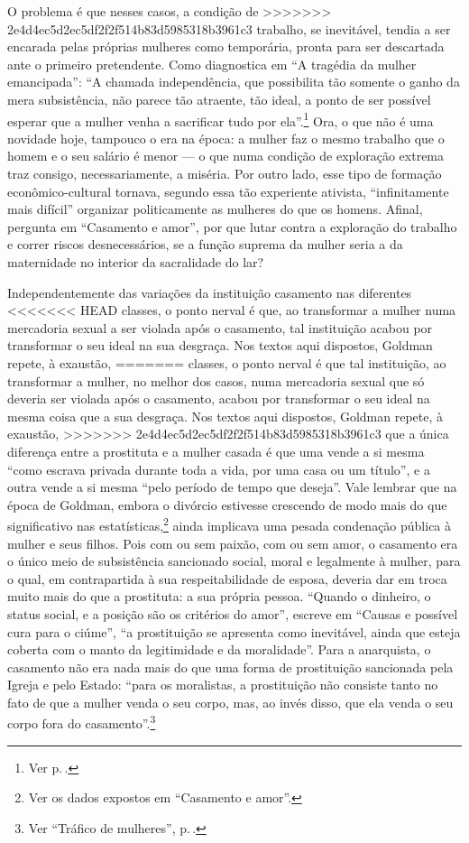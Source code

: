 O problema é que nesses casos, a condição de
>>>>>>> 2e4d4ec5d2ec5df2f2f514b83d5985318b3961c3
trabalho, se inevitável, tendia a ser encarada pelas próprias mulheres
como temporária, pronta para ser descartada ante o primeiro pretendente.
Como diagnostica em ``A tragédia da mulher emancipada'': ``A
chamada independência, que possibilita tão somente o ganho da mera
subsistência, não parece tão atraente, tão ideal, a ponto de ser possível
esperar que a mulher venha a sacrificar tudo por ela''.\footnote{Ver p.\,\pageref{ganho}.} Ora, o que não é
uma novidade hoje, tampouco o era na época: a mulher faz o mesmo
trabalho que o homem e o seu salário é menor --- o que numa condição de
exploração extrema traz consigo, necessariamente, a miséria. Por outro
lado, esse tipo de formação econômico-cultural tornava, segundo essa tão
experiente ativista, ``infinitamente mais difícil'' organizar
politicamente as mulheres do que os homens. Afinal, pergunta em
``Casamento e amor'', por que lutar contra a exploração do trabalho e
correr riscos desnecessários, se a função suprema da mulher seria a da
maternidade no interior da sacralidade do lar?

Independentemente das variações da instituição casamento nas diferentes
<<<<<<< HEAD
classes, o ponto nerval é que, ao transformar a mulher
numa mercadoria sexual a ser violada
após o casamento, tal instituição acabou por transformar o seu ideal na sua desgraça.
Nos textos aqui dispostos, Goldman repete, à exaustão,
=======
classes, o ponto nerval é que tal instituição, ao transformar a mulher,
no melhor dos casos, numa mercadoria sexual que só deveria ser violada
após o casamento, acabou por transformar o seu ideal na mesma coisa que
a sua desgraça. Nos textos aqui dispostos, Goldman repete, à exaustão,
>>>>>>> 2e4d4ec5d2ec5df2f2f514b83d5985318b3961c3
que a única diferença entre a prostituta e a mulher casada é que uma
vende a si mesma ``como escrava privada durante toda a vida, por uma
casa ou um título'', e a outra vende a si mesma ``pelo período de tempo
que deseja''. Vale lembrar que na época de Goldman, embora o divórcio
estivesse crescendo de modo mais do que significativo nas estatísticas,\footnote{Ver os dados expostos em ``Casamento e amor''.}
ainda implicava uma
pesada condenação pública à mulher e seus filhos. Pois com ou sem
paixão, com ou sem amor, o casamento era o único meio de subsistência
sancionado social, moral e legalmente à mulher, para o qual, em
contrapartida à sua respeitabilidade de esposa, deveria dar em troca
muito mais do que a prostituta: a sua própria pessoa. ``Quando o
dinheiro, o status social, e a posição são os critérios do amor'',
escreve em ``Causas e possível cura para o ciúme'', ``a prostituição se
apresenta como inevitável, ainda que esteja coberta com o manto da
legitimidade e da moralidade''. Para a anarquista, o casamento não era
nada mais do que uma forma de prostituição sancionada pela Igreja e pelo
Estado: ``para os moralistas, a prostituição não consiste tanto no fato de que a mulher
venda o seu corpo, mas, ao invés disso, que ela venda o seu corpo fora
do casamento''.\footnote{Ver ``Tráfico de mulheres'', p.\,\pageref{vender}.}

